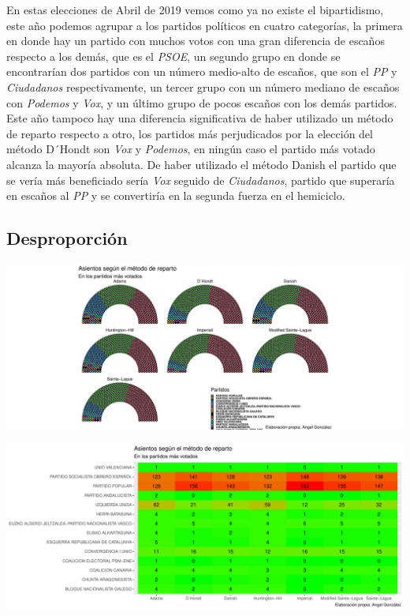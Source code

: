 \documentclass[12pt,a4paper,]{book}
\numberwithin{dummy}{section}
\theoremstyle{ocrenumbox}
\theoremstyle{blacknumex}
\theoremstyle{blacknumbox}
\theoremstyle{ocrenum}
\theoremstyle{ocrenum}
\begin{document}
En estas elecciones de Abril de 2019 vemos como ya no existe el
bipartidismo, este año podemos agrupar a los partidos políticos en
cuatro categorías, la primera en donde hay un partido con muchos votos
con una gran diferencia de escaños respecto a los demás, que es el
\emph{PSOE}, un segundo grupo en donde se encontrarían dos partidos con
un número medio-alto de escaños, que son el \emph{PP} y
\emph{Ciudadanos} respectivamente, un tercer grupo con un número mediano
de escaños con \emph{Podemos} y \emph{Vox}, y un último grupo de pocos
escaños con los demás partidos. Este año tampoco hay una diferencia
significativa de haber utilizado un método de reparto respecto a otro,
los partidos más perjudicados por la elección del método D´Hondt son
\emph{Vox} y \emph{Podemos}, en ningún caso el partido más votado
alcanza la mayoría absoluta. De haber utilizado el método Danish el
partido que se vería más beneficiado sería \emph{Vox} seguido de
\emph{Ciudadanos}, partido que superaría en escaños al \emph{PP} y se
convertiría en la segunda fuerza en el hemiciclo.

\hypertarget{desproporciuxf3n-13}{%
\subsection{Desproporción}\label{desproporciuxf3n-13}}

\begin{center}\includegraphics[width=1\linewidth]{figurasR/unnamed-chunk-116-1} \end{center}

\begin{center}\includegraphics[width=1\linewidth]{figurasR/unnamed-chunk-116-2} \end{center}
\end{document}
